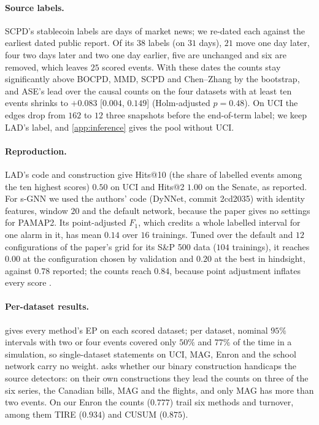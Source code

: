 \documentclass[11pt]{article}
\theoremstyle{dsplain}
\theoremstyle{definition}
\begin{document}
\paragraph{Source labels.} SCPD's stablecoin labels are days of market news; we re-dated each against the
earliest dated public report. Of its $38$ labels (on $31$ days), $21$ move one day later, four two days
later and two one day earlier, five are unchanged and six are removed, which leaves $25$ scored events.
With these dates the counts stay significantly above BOCPD, MMD, SCPD and Chen--Zhang by the bootstrap,
and ASE's lead over the causal counts on the four datasets with at least ten events shrinks to $+0.083$
[$0.004$, $0.149$] (Holm-adjusted $p = 0.48$). On UCI the edges drop from $162$ to $12$ three snapshots
before the end-of-term label; we keep LAD's label, and \cref{app:inference} gives the pool without UCI.

\paragraph{Reproduction.} LAD's code and construction give Hits@10 (the share of labelled events among the
ten highest scores) $0.50$ on UCI and Hits@2 $1.00$ on the Senate, as reported. For s-GNN we used the authors' code (DyNNet, commit
2cd2035) with identity features, window $20$ and the default network, because the paper gives no settings
for PAMAP2. Its point-adjusted $F_1$, which credits a whole labelled interval for one alarm in it, has mean
$0.14$ over $16$ trainings. Tuned over the default and $12$ configurations of the paper's grid for its S\&P
500 data ($104$ trainings), it reaches $0.00$ at the configuration chosen by validation and $0.20$ at the
best in hindsight, against $0.78$ reported; the counts reach $0.84$, because point adjustment inflates every
score \citep{kim2022towards}.

\paragraph{Per-dataset results.}  gives every method's EP on each scored dataset; per
dataset, nominal $95\%$ intervals with two or four events covered only $50\%$ and $77\%$ of the time in a
simulation, so single-dataset statements on UCI, MAG, Enron and the school network carry no weight.
 asks whether our binary construction handicaps the source detectors: on their own
constructions they lead the counts on three of the six series, the Canadian bills, MAG and the flights,
and only MAG has more than two events. On our Enron the counts ($0.777$) trail six methods and turnover, among them TIRE ($0.934$) and CUSUM
($0.875$).
\end{document}
